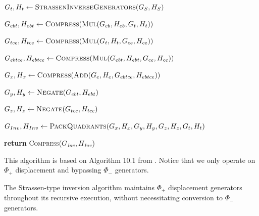 \begin{algorithm}[H]
\begin{algorithmic}[1]
    \State $G_t, H_t \gets \textsc{StrassenInverseGenerators}(G_S,
    H_S)$ 

    \Statex

    \State $G_{ebt}, H_{ebt} \gets
    \textsc{Compress}(\textsc{Mul}(G_{eb}, H_{eb}, G_t, H_t))$

    \State $G_{tce}, H_{tce} \gets
    \textsc{Compress}(\textsc{Mul}(G_t, H_t, G_{ce}, H_{ce}))$

    \State $G_{ebtce}, H_{ebtce} \gets
    \textsc{Compress}(\textsc{Mul}(G_{ebt}, H_{ebt}, G_{ce}, H_{ce}))$

    \Statex

    \State $G_x, H_x \gets \textsc{Compress}(\textsc{Add}(G_e, H_e,
    G_{ebtce}, H_{ebtce}))$ 

    \State $G_y, H_y \gets \textsc{Negate}(G_{ebt}, H_{ebt})$

    \State $G_z, H_z \gets \textsc{Negate}(G_{tce}, H_{tce})$

    \Statex

    \State $G_{Inv}, H_{Inv} \gets \textsc{PackQuadrants}(G_x, H_x,
    G_y, H_y, G_z, H_z, G_t, H_t)$ 

    \State \textbf{return} \textsc{Compress}($G_{Inv}, H_{Inv}$)

    \EndProcedure
  \end{algorithmic}
\end{algorithm}

This algorithm is based on Algorithm 10.1 from \cite[Algorithme
10.1]{aecf-2017-pdf}.
Notice that we only operate on $\Phi_+$ displacement and bypassing
$\Phi_-$ generators.

\begin{proposition}
  The Strassen-type inversion algorithm maintains $\Phi_+$
  displacement generators throughout its recursive execution, without
  necessitating conversion to $\Phi_-$ generators.
\end{proposition}

